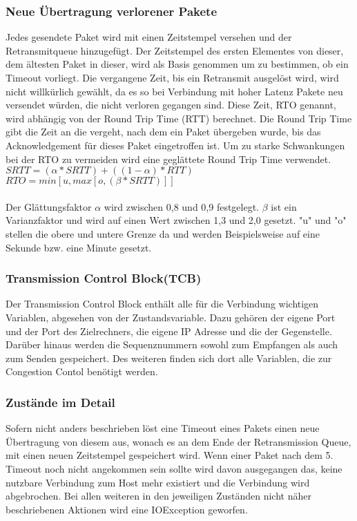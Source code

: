 \subsubsection{Neue Übertragung verlorener Pakete}
Jedes gesendete Paket wird mit einen Zeitstempel versehen und der Retransmitqueue hinzugefügt. Der Zeitstempel des ersten Elementes von dieser, dem ältesten Paket in dieser, wird als Basis genommen um zu bestimmen, ob ein Timeout vorliegt. Die vergangene Zeit, bis ein Retransmit ausgelöst wird, wird nicht willkürlich gewählt, da es so bei Verbindung mit hoher Latenz Pakete neu versendet würden, die nicht verloren gegangen sind. Diese Zeit, RTO genannt, wird abhängig von der Round Trip Time (RTT) berechnet. Die Round Trip Time gibt die Zeit an die vergeht, nach dem ein Paket übergeben wurde, bis das Acknowledgement für dieses Paket eingetroffen ist.  Um zu starke Schwankungen bei der RTO zu vermeiden wird eine geglättete Round Trip Time verwendet. \\
$SRTT = (\alpha * SRTT) + ((1-\alpha)*RTT)$\\
$RTO = min [u, max [o, (\beta *SRTT)]]$\\\\
Der Glättungsfaktor $\alpha$ wird zwischen 0,8 und 0,9 festgelegt. $\beta$ ist ein Varianzfaktor und wird auf einen Wert zwischen 1,3 und 2,0 gesetzt. {}"u"{} und {}"o"{} stellen die obere und untere Grenze da und werden Beispielsweise auf eine Sekunde bzw. eine Minute gesetzt.


\subsubsection{Transmission Control Block(TCB)}

Der Transmission Control Block enthält alle für die Verbindung wichtigen Variablen, abgesehen von der Zustandsvariable.  Dazu gehören der eigene Port und der Port des Zielrechners, die eigene IP Adresse und die der Gegenstelle. Darüber hinaus werden die Sequenznummern sowohl zum Empfangen als auch zum Senden gespeichert.  Des weiteren finden sich dort alle Variablen, die zur Congestion Contol benötigt werden.  


\subsubsection{Zustände im Detail}
Sofern nicht anders beschrieben löst eine Timeout eines Pakets einen neue Übertragung von diesem aus, wonach es an dem Ende der Retransmission Queue, mit einen neuen Zeitstempel gespeichert wird. Wenn einer Paket nach dem 5. Timeout noch nicht angekommen sein sollte wird davon ausgegangen das, keine nutzbare Verbindung zum Host mehr existiert und die Verbindung wird abgebrochen. 
Bei allen weiteren in den jeweiligen Zuständen nicht näher beschriebenen Aktionen wird eine IOException geworfen.

